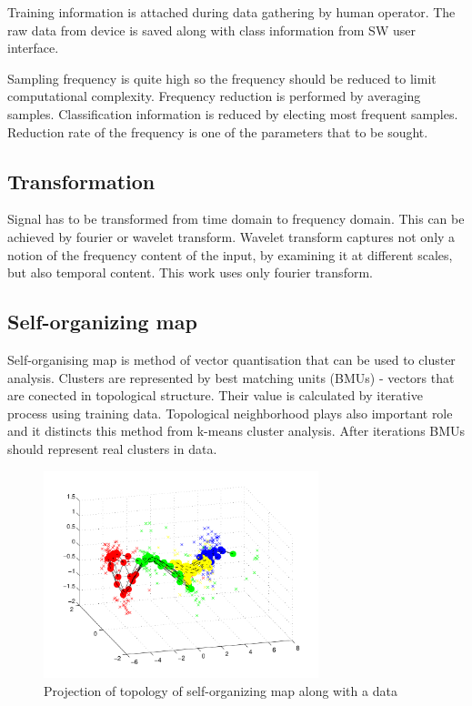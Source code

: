\documentclass[a4paper,journal]{IEEEtran}
\begin{document}
Training information is attached during data gathering by human operator.
The raw data from device is saved along with class information from
SW user interface.

Sampling frequency is quite high so the frequency should be reduced to limit
computational complexity. Frequency reduction is performed
by averaging samples. Classification information is reduced by electing
most frequent samples. Reduction rate of the frequency is one of the 
parameters that to be sought.

\subsection{Transformation}
Signal has to be transformed from time domain to frequency domain.
This can be achieved by fourier or wavelet transform.
Wavelet transform
captures not only a notion of the frequency content of the input,
by examining it at different scales, but also temporal content.
This work uses only fourier transform.



\subsection{Self-organizing map}
Self-organising map is method of vector quantisation that can be used to 
cluster analysis. Clusters are represented by best matching units (BMUs)
- vectors that are conected in topological structure. Their value is calculated
by iterative process using training data. Topological neighborhood plays 
also important role and it distincts this method from k-means cluster analysis.
After iterations BMUs should represent real clusters in data.
\begin{figure}[h]
\includegraphics[width=80mm]{som_topol_proj}
\caption{Projection of topology of self-organizing map along with a data}
\label{som_topol_proj}
\end{figure}
\end{document}
